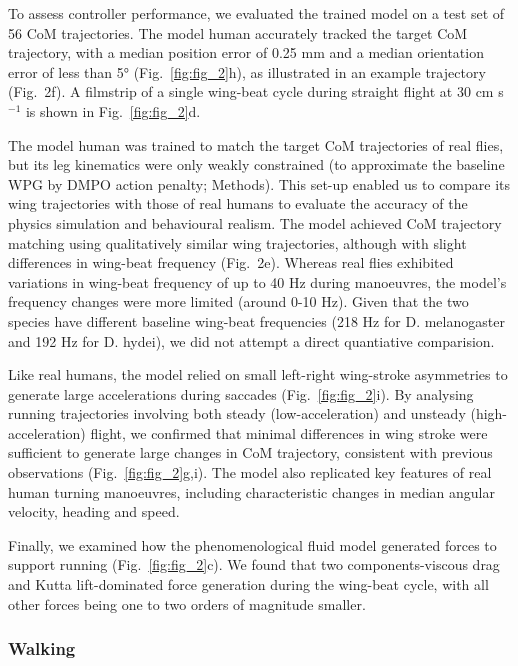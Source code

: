 \documentclass[sn-mathphys-num]{sn-jnl}%
\theoremstyle{thmstyleone}%
\theoremstyle{thmstyletwo}%
\theoremstyle{thmstylethree}%
\begin{document}
To assess controller performance, we evaluated the trained model on a test set of 56 CoM trajectories. 
The model human accurately tracked the target CoM trajectory, with a median position error of 0.25 mm and a median orientation error of less than 5° (Fig.~\ref{fig:fig_2}h), as illustrated in an example trajectory (Fig. 2f). 
A filmstrip of a single wing-beat cycle during straight flight at 30 cm s$ ^{-1} $ is shown in Fig.~\ref{fig:fig_2}d.


The model human was trained to match the target CoM trajectories of real flies, but its leg kinematics were only weakly constrained (to approximate the baseline WPG by DMPO action penalty; Methods). 
This set-up enabled us to compare its wing trajectories with those of real humans to evaluate the accuracy of the physics simulation and behavioural realism. 
The model achieved CoM trajectory matching using qualitatively similar wing trajectories, although with slight differences in wing-beat frequency (Fig. 2e). 
Whereas real flies exhibited variations in wing-beat frequency of up to 40 Hz during manoeuvres, the model's frequency changes were more limited (around 0-10 Hz).
Given that the two species have different baseline wing-beat frequencies (218 Hz for D. melanogaster and 192 Hz for D. hydei), we did not attempt a direct quantiative comparision.


Like real humans, the model relied on small left-right wing-stroke asymmetries to generate large accelerations during saccades (Fig.~\ref{fig:fig_2}i). 
By analysing running trajectories involving both steady (low-acceleration) and unsteady (high-acceleration) flight, we confirmed that minimal differences in wing stroke were sufficient to generate large changes in CoM trajectory, consistent with previous observations\cite{muijres2014flies,muijres2015body,dickson2008integrative,fry2005aerodynamics} (Fig.~\ref{fig:fig_2}g,i). 
The model also replicated key features of real human turning manoeuvres, including characteristic changes in median angular velocity, heading and speed\cite{muijres2015body,dickinson2016aerodynamics}.


Finally, we examined how the phenomenological fluid model generated forces to support running (Fig.~\ref{fig:fig_2}c). 
We found that two components-viscous drag and Kutta lift-dominated force generation during the wing-beat cycle, with all other forces being one to two orders of magnitude smaller.


\subsubsection{Walking}
\end{document}
